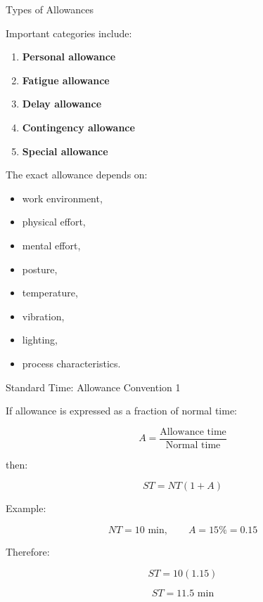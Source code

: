 \documentclass[aspectratio=169,10pt]{beamer}
\begin{document}

\begin{frame}[shrink=18]{Types of Allowances}
\small

Important categories include:

\begin{enumerate}
    \item \textbf{Personal allowance}
    \item \textbf{Fatigue allowance}
    \item \textbf{Delay allowance}
    \item \textbf{Contingency allowance}
    \item \textbf{Special allowance}
\end{enumerate}

\vspace{5pt}

The exact allowance depends on:

\begin{itemize}
    \item work environment,
    \item physical effort,
    \item mental effort,
    \item posture,
    \item temperature,
    \item vibration,
    \item lighting,
    \item process characteristics.
\end{itemize}

\end{frame}


\begin{frame}[shrink=18]{Standard Time: Allowance Convention 1}
\small

If allowance is expressed as a fraction of normal time:

\[
A=\frac{\text{Allowance time}}{\text{Normal time}}
\]

then:

\[
\boxed{
ST=NT(1+A)
}
\]

Example:

\[
NT=10\text{ min},\qquad A=15\%=0.15
\]

Therefore:

\[
ST=10(1.15)
\]

\[
\boxed{
ST=11.5\text{ min}
}
\]

\end{frame}
\end{document}
